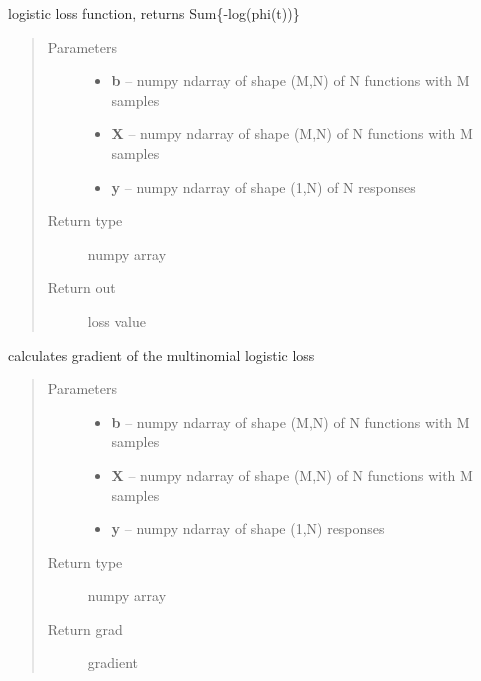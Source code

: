 \documentclass[letterpaper,10pt,english]{sphinxmanual}
\begin{document}
\begin{fulllineitems}
\label{regression:regression.logit_loss}
logistic loss function, returns Sum\{-log(phi(t))\}
\begin{quote}\begin{description}
\item[{Parameters}] \leavevmode\begin{itemize}
\item {} 
\textbf{b} -- numpy ndarray of shape (M,N) of N functions with M samples

\item {} 
\textbf{X} -- numpy ndarray of shape (M,N) of N functions with M samples

\item {} 
\textbf{y} -- numpy ndarray of shape (1,N) of N responses

\end{itemize}

\item[{Return type}] \leavevmode
numpy array

\item[{Return out}] \leavevmode
loss value

\end{description}\end{quote}

\end{fulllineitems}


\begin{fulllineitems}
\label{regression:regression.mlogit_gradient}
calculates gradient of the multinomial logistic loss
\begin{quote}\begin{description}
\item[{Parameters}] \leavevmode\begin{itemize}
\item {} 
\textbf{b} -- numpy ndarray of shape (M,N) of N functions with M samples

\item {} 
\textbf{X} -- numpy ndarray of shape (M,N) of N functions with M samples

\item {} 
\textbf{y} -- numpy ndarray of shape (1,N) responses

\end{itemize}

\item[{Return type}] \leavevmode
numpy array

\item[{Return grad}] \leavevmode
gradient

\end{description}\end{quote}

\end{fulllineitems}
\end{document}
